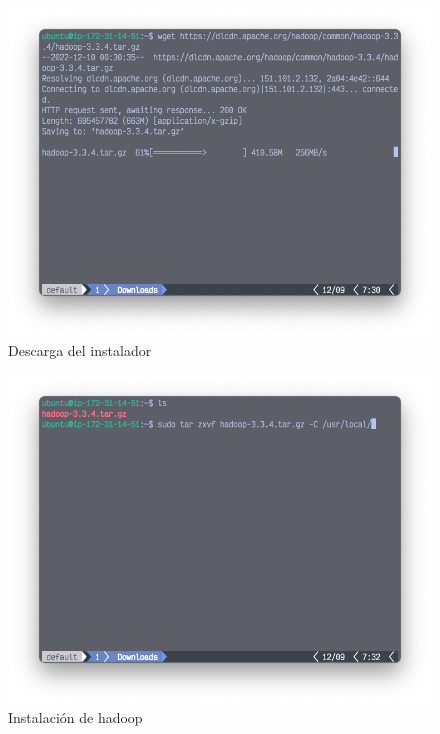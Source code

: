 \begin{figure}[h]
	\centering
	\includegraphics[scale=.35] {img/18-wgetHadoop}
	\caption{Descarga del instalador}
	\label{fig:18}
\end{figure}

\begin{figure}[h]
	\centering
	\includegraphics[scale=.35] {img/19-tarXVFZ}
	\caption{Instalación de hadoop}
	\label{fig:19}
\end{figure}

\clearpage

